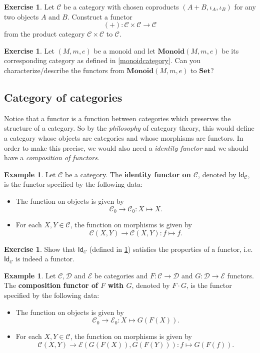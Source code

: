 \documentclass[a4paper,10pt]{scrartcl}
\theoremstyle{plain}
\theoremstyle{definition}
\newtheorem{exa}[thm]{Example}
\newtheorem{exer}[thm]{Exercise}
\newcommand{\cfont}[1]{\ensuremath{\mathsf{#1}}}
\newcommand{\Cat}[1]{\mathcal{#1}}
\newcommand{\CC}{\Cat{C}}
\newcommand{\DD}{\Cat{D}}
\newcommand{\EE}{\Cat{E}}
\newcommand{\Catb}[1]{\mathbf{#1}}
\newcommand{\SET}{\Catb{Set}}
\newcommand{\MON}{\Catb{Monoid}}
\newcommand{\Ob}[1]{{#1}_0}
\newcommand{\CHom}[3]{{#1}(#2,#3)}
\newcommand{\Id}[1][]{\cfont{Id}_{#1}}
\newcommand{\Comp}{\cdot}
\begin{document}
\begin{exer}
  Let $\CC$ be a category with chosen coproducts $(A + B, \iota_A, \iota_B)$ for any two objects $A$ and $B$.
  Construct a functor
  \[ (+) : \CC\times \CC \to \CC\]
  from the product category $\CC\times \CC$ to $\CC$.
\end{exer}




\begin{exer}\label{ex:monoid_functors} Let $(M,m,e)$ be a monoid and let $\MON(M,m,e)$ be its corresponding category as defined in \cref{monoidcategory}. Can you characterize/describe the functors from $\MON(M,m,e)$ to $\SET$?
\end{exer}

\subsection{Category of categories}
Notice that a functor is a function between categories which preserves the structure of a category. So by the \textit{philosophy} of category theory, this would define a category whose objects are categories and whose morphisms are functors. In order to make this precise, we would also need a \textit{identity functor} and we should have a \textit{composition of functors}.

\begin{exa}\label{example:functor_id} Let $\CC$ be a category. The \textbf{identity functor on $\CC$}, denoted by $\Id[\CC]$, is the functor specified by the following data:
\begin{itemize}
\item The function on objects is given by
\[
\Ob{\CC}\to \Ob{\CC}: X\mapsto X.
\]
\item For each $X,Y\in\CC$, the function on morphisms is given by
\[
\CHom \CC X Y\to \CHom \CC X Y: f\mapsto f.
\]
\end{itemize}
\end{exa}

\begin{exer} Show that $\Id[\CC]$ (defined in \cref{example:functor_id}) satisfies the properties of a functor, i.e. $\Id[\CC]$ is indeed a functor.
\end{exer}

\begin{exa}\label{example:functor_comp} Let $\CC,\DD$ and $\EE$ be  categories and $F:\CC\to\DD$ and $G:\DD\to\EE$ functors. The \textbf{composition functor of $F$ with $G$}, denoted by $F\Comp G$, is the functor specified by the following data:
\begin{itemize}
\item The function on objects is given by
\[
\Ob{\CC}\to \Ob{\EE}: X\mapsto G(F(X)).
\]
\item For each $X,Y\in\CC$, the function on morphisms is given by
\[
\CHom \CC X Y\to \CHom{\EE}{G(F(X))}{G(F(Y))}: f\mapsto G(F(f)).
\]
\end{itemize}
\end{exa}
\end{document}
